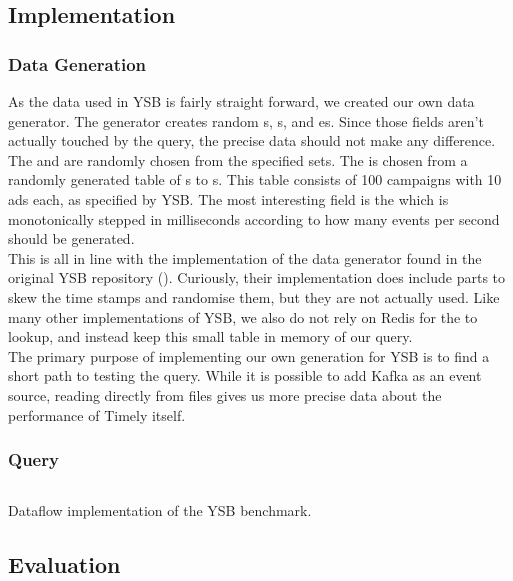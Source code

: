 \subsection{Implementation}
\subsubsection{Data Generation}
As the data used in YSB is fairly straight forward, we created our own data generator. The generator creates random s, s, and es. Since those fields aren't actually touched by the query, the precise data should not make any difference. The  and  are randomly chosen from the specified sets. The  is chosen from a randomly generated table of s to s. This table consists of 100 campaigns with 10 ads each, as specified by YSB. The most interesting field is the  which is monotonically stepped in milliseconds according to how many events per second should be generated. \\

This is all in line with the implementation of the data generator found in the original YSB repository (). Curiously, their implementation does include parts to skew the time stamps and randomise them, but they are not actually used. Like many other implementations of YSB, we also do not rely on Redis for the  to  lookup, and instead keep this small table in memory of our query. \\

The primary purpose of implementing our own generation for YSB is to find a short path to testing the query. While it is possible to add Kafka as an event source, reading directly from files gives us more precise data about the performance of Timely itself.

\subsubsection{Query}
\begin{listing}[H]
  \inputminted[firstline=158,lastline=167]{rust}{benchmarks/src/ysb.rs}
  \caption{Dataflow implementation of the YSB benchmark.}
  \label{lst:ysb}
\end{listing}

\subsection{Evaluation}


